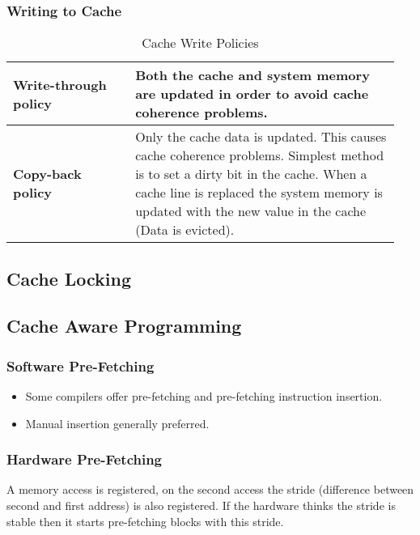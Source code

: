 		\subsubsection{Writing to Cache}
			\begin{table}[H]
				\centering
				\begin{tabular}{|p{0.3\linewidth}|p{0.65\linewidth}|}
					\hline
					\textbf{Write-through policy}
						& Both the cache and system memory are updated in order to avoid cache coherence problems.\\
					\hline
					\textbf{Copy-back policy}
						& Only the cache data is updated. This causes cache coherence problems. Simplest method is to set a dirty bit in the cache. When a cache line is replaced the system memory is updated with the new value in the cache (Data is evicted).\\
					\hline
				\end{tabular}
				\caption{Cache Write Policies}
			\end{table}
			
	\subsection{Cache Locking}
		
	\subsection{Cache Aware Programming}
		\subsubsection{Software Pre-Fetching }
			\begin{itemize}
			  \item Some compilers offer pre-fetching and pre-fetching instruction insertion.
			  \item Manual insertion generally preferred.
			\end{itemize}
			
		
		
		\subsubsection{Hardware Pre-Fetching }
			A memory access is registered, on the second access the stride (difference between second and first address) is also registered. If the hardware thinks the stride is stable then it starts pre-fetching blocks with this stride.
			
